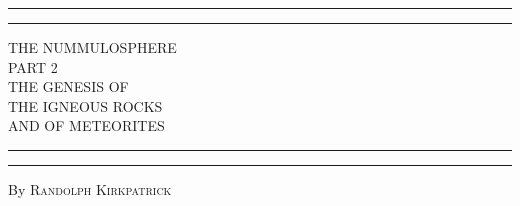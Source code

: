 \documentclass[a4paper, 12pt, oneside]{article}
\begin{document}
\begin{titlepage} %
	\centering %
	\scshape %

	
	\rule{\textwidth}{1.6pt}\vspace*{-\baselineskip}\vspace*{2pt} %
	\rule{\textwidth}{0.4pt} %
	
	\vspace{0.75\baselineskip} %

        {\LARGE THE NUMMULOSPHERE\\ PART 2\\ THE GENESIS OF \\THE IGNEOUS ROCKS\\ AND OF METEORITES\\} %
	
	\vspace{0.75\baselineskip} %
	
	\rule{\textwidth}{0.4pt}\vspace*{-\baselineskip}\vspace{3.2pt} %
	\rule{\textwidth}{1.6pt} %
	
	\vspace{1\baselineskip} %
	
	
	{By \scshape\Large Randolph Kirkpatrick\\} %
	
	\vspace*{1\baselineskip} %
	
	
	\vspace{1\baselineskip} %

	

\end{titlepage}
\end{document}

